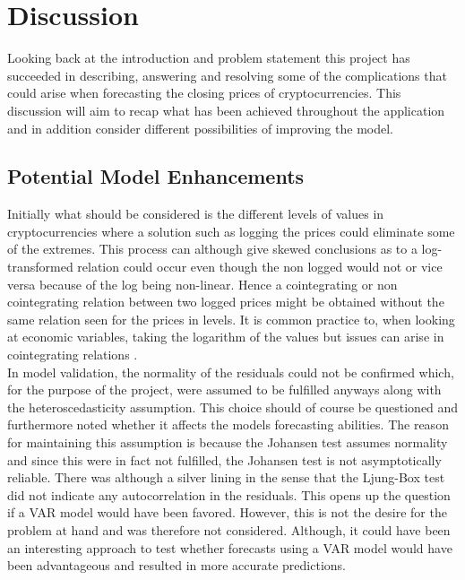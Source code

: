 \chapter{Discussion}
Looking back at the introduction and problem statement this project has succeeded in describing, answering and resolving some of the complications that could arise when forecasting the closing prices of cryptocurrencies. This discussion will aim to recap what has been achieved throughout the application and in addition consider different possibilities of improving the model.

\section{Potential Model Enhancements}
Initially what should be considered is the different levels of values in cryptocurrencies where a solution such as logging the prices could eliminate some of the extremes. This process can although give skewed conclusions as to a log-transformed relation could occur even though the non logged would not or vice versa because of the log being non-linear. Hence a cointegrating or non cointegrating relation between two logged prices might be obtained without the same relation seen for the prices in levels. It is common practice to, when looking at economic variables, taking the logarithm of the values but issues can arise in cointegrating relations \cite{cointegrationloggedissues}.\\

\noindent In model validation, the normality of the residuals could not be confirmed which, for the purpose of the project, were assumed to be fulfilled anyways along with the heteroscedasticity assumption. This choice should of course be questioned and furthermore noted whether it affects the models forecasting abilities. The reason for maintaining this assumption is because the Johansen test assumes normality and since this were in fact not fulfilled, the Johansen test is not asymptotically reliable. There was although a silver lining in the sense that the Ljung-Box test did not indicate any autocorrelation in the residuals. This opens up the question if a VAR model would have been favored. However, this is not the desire for the problem at hand and was therefore not considered. Although, it could have been an interesting approach to test whether forecasts using a VAR model would have been advantageous and resulted in more accurate predictions.\\

